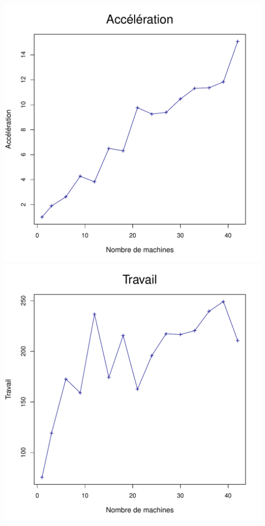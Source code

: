 \documentclass[a4paper, 11pt, titlepage]{article}
\begin{document}
\begin{center}
    \includegraphics[scale=0.45]{res/sujet_makefiles_premier_Makefile-small_nth1_acc.pdf}
    \includegraphics[scale=0.45]{res/sujet_makefiles_premier_Makefile-small_nth1_work.pdf}
\end{center}
\end{document}
